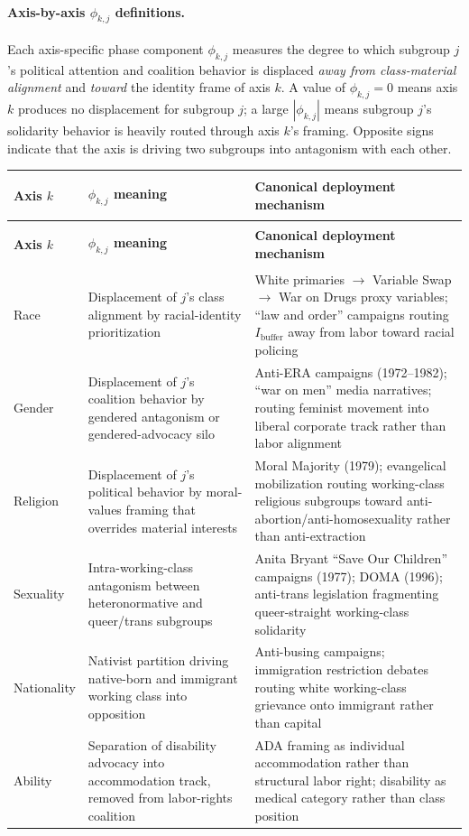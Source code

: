 \documentclass[12pt,openany]{book}
\begin{document}
\paragraph{Axis-by-axis $\phi_{k,j}$ definitions.}
Each axis-specific phase component $\phi_{k,j}$ measures the degree to which subgroup $j$'s political attention and coalition behavior is displaced \textit{away from class-material alignment} and \textit{toward} the identity frame of axis $k$. A value of $\phi_{k,j} = 0$ means axis $k$ produces no displacement for subgroup $j$; a large $|\phi_{k,j}|$ means subgroup $j$'s solidarity behavior is heavily routed through axis $k$'s framing. Opposite signs indicate that the axis is driving two subgroups into antagonism with each other.

\begin{longtable}{>{\bfseries\raggedright}p{2.0cm} >{\raggedright}p{3.5cm} >{\raggedright\arraybackslash}p{7.5cm}}
\toprule
\textbf{Axis $k$} & \textbf{$\phi_{k,j}$ meaning} & \textbf{Canonical deployment mechanism} \\
\midrule
\endfirsthead
\toprule
\textbf{Axis $k$} & \textbf{$\phi_{k,j}$ meaning} & \textbf{Canonical deployment mechanism} \\
\midrule
\endhead
Race &
Displacement of $j$'s class alignment by racial-identity prioritization &
White primaries $\to$ Variable Swap $\to$ War on Drugs proxy variables; ``law and order'' campaigns routing $I_{\text{buffer}}$ away from labor toward racial policing \\
\midrule
Gender &
Displacement of $j$'s coalition behavior by gendered antagonism or gendered-advocacy silo &
Anti-ERA campaigns (1972--1982); ``war on men'' media narratives; routing feminist movement into liberal corporate track rather than labor alignment \\
\midrule
Religion &
Displacement of $j$'s political behavior by moral-values framing that overrides material interests &
Moral Majority (1979); evangelical mobilization routing working-class religious subgroups toward anti-abortion/anti-homosexuality rather than anti-extraction \\
\midrule
Sexuality &
Intra-working-class antagonism between heteronormative and queer/trans subgroups &
Anita Bryant ``Save Our Children'' campaigns (1977); DOMA (1996); anti-trans legislation fragmenting queer-straight working-class solidarity \\
\midrule
Nationality &
Nativist partition driving native-born and immigrant working class into opposition &
Anti-busing campaigns; immigration restriction debates routing white working-class grievance onto immigrant rather than capital \\
\midrule
Ability &
Separation of disability advocacy into accommodation track, removed from labor-rights coalition &
ADA framing as individual accommodation rather than structural labor right; disability as medical category rather than class position \\
\bottomrule
\end{longtable}
\end{document}
